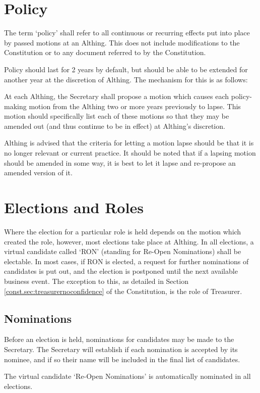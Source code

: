 \documentclass[a4paper, 12pt]{article} %
\begin{document}
\section{Policy}
The term `policy' shall refer to all continuous or recurring effects put into place by passed motions at an Althing. This does not include modifications to the Constitution or to any document referred to by the Constitution.

Policy should last for 2 years by default, but should be able to be extended for another year at the discretion of Althing. The mechanism for this is as follows:

At each Althing, the Secretary shall propose a motion which causes each policy-making motion from the Althing two or more years previously to lapse. This motion should specifically list each of these motions so that they may be amended out (and thus continue to be in effect) at Althing's discretion.

Althing is advised that the criteria for letting a motion lapse should be that it is no longer relevant or current practice.  It should be noted that if a lapsing motion should be amended in some way, it is best to let it lapse and re-propose an amended version of it.

\section{Elections and Roles}
Where the election for a particular role is held depends on the motion which created the role, however, most elections take place at Althing.  In all elections, a virtual candidate called `RON' (standing for Re-Open Nominations) shall be electable.  In most cases, if RON is elected, a request for further nominations of candidates is put out, and the election is postponed until the next available business event.  The exception to this, as detailed in Section \autoref{const.sec:treasurernoconfidence} of the Constitution, is the role of Treasurer.

\subsection{Nominations}
Before an election is held, nominations for candidates may be made to the Secretary.  The Secretary will establish if each nomination is accepted by its nominee, and if so their name will be included in the final list of candidates.

The virtual candidate `Re-Open Nominations' is automatically nominated in all elections.
\end{document}
